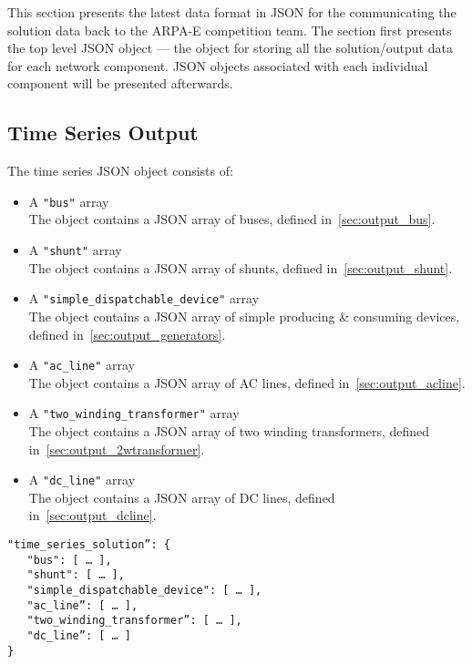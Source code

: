 \label{sec:solution_format}
This section presents the latest data format in JSON for the 
communicating the solution data back to the ARPA-E competition team.
The section first presents the top level JSON object --- the
object for storing all the solution/output data 
for each network component.
JSON objects associated with each individual component will be presented afterwards.


\label{sec:output_data}
\subsection{Time Series Output}
The time series JSON object consists of:
\begin{itemize}
    \item A \texttt{"bus"} array\\
    The object contains a JSON array of buses, defined in~\ref{sec:output_bus}.
    \item A \texttt{"shunt"} array\\
    The object contains a JSON array of shunts, defined in~\ref{sec:output_shunt}.
    \item A \texttt{"simple\_dispatchable\_device"} array\\
    The object contains a JSON array of simple producing \& consuming devices, defined in~\ref{sec:output_generators}.
    \item A \texttt{"ac\_line"} array\\
    The object contains a JSON array of AC lines, defined in~\ref{sec:output_acline}.
    \item A \texttt{"two\_winding\_transformer"} array\\
    The object contains a JSON array of two winding transformers, defined in~\ref{sec:output_2wtransformer}.
    \item A \texttt{"dc\_line"} array\\
    The object contains a JSON array of DC lines, defined in~\ref{sec:output_dcline}.
\end{itemize}

\begin{verbatim}
"time_series_solution”: {
   "bus": [ … ],
   "shunt": [ … ],
   "simple_dispatchable_device": [ … ],
   "ac_line”: [ … ],
   "two_winding_transformer”: [ … ],
   "dc_line”: [ … ]
}    
\end{verbatim}

